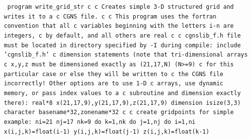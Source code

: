 \documentclass[12pt]{article}
\begin{document}
{\tt 
\indent       program write\_grid\_str
\newline c
\newline c   Creates simple 3-D structured grid and writes it to a
\newline c   CGNS file.
\newline c
\newline c   This program uses the fortran convention that all
\newline c   variables beginning with the letters i-n are integers,
\newline c   by default, and all others are real
\newline c
\newline c   cgnslib\_f.h file must be located in directory specified by -I during compile:
\newline\indent      include 'cgnslib\_f.h'
\newline c   dimension statements (note that tri-dimensional arrays
\newline c   x,y,z must be dimensioned exactly as (21,17,N) (N>=9)
\newline c   for this particular case or else they will be written to
\newline c   the CGNS file incorrectly!  Other options are to use 1-D
\newline c   arrays, use dynamic memory, or pass index values to a
\newline c   subroutine and dimension exactly there):
\newline\indent      real*8 x(21,17,9),y(21,17,9),z(21,17,9)
\newline\indent      dimension isize(3,3)
\newline\indent      character basename*32,zonename*32
\newline c
\newline c   create gridpoints for simple example:
\newline\indent      ni=21
\newline\indent      nj=17
\newline\indent      nk=9
\newline\indent      do k=1,nk
\newline\indent\indent        do j=1,nj
\newline\indent\indent\indent          do i=1,ni
\newline\indent\indent\indent\indent            x(i,j,k)=float(i-1)
\newline\indent\indent\indent\indent            y(i,j,k)=float(j-1)
\newline\indent\indent\indent\indent            z(i,j,k)=float(k-1)
}
\end{document}
